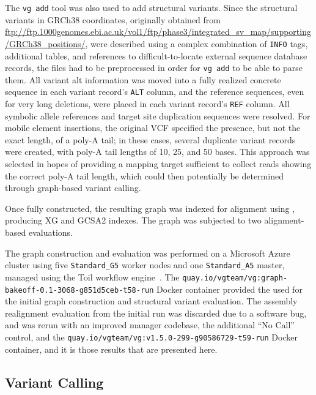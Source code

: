 The \texttt{vg add} tool was also used to add structural variants. Since the structural variants in GRCh38 coordinates, originally obtained from \url{ftp://ftp.1000genomes.ebi.ac.uk/vol1/ftp/phase3/integrated_sv_map/supporting/GRCh38_positions/}, were described using a complex combination of \texttt{INFO} tags, additional tables, and references to difficult-to-locate external sequence database records, the files had to be preprocessed in order for \texttt{vg add} to be able to parse them. All variant alt information was moved into a fully realized concrete sequence in each variant record's \texttt{ALT} column, and the reference sequences, even for very long deletions, were placed in each variant record's \texttt{REF} column. All symbolic allele references and target site duplication sequences were resolved. For mobile element insertions, the original VCF specified the presence, but not the exact length, of a poly-A tail; in these cases, several duplicate variant records were created, with poly-A tail lengths of 10, 25, and 50 bases. This approach was selected in hopes of providing a mapping target sufficient to collect reads showing the correct poly-A tail length, which could then potentially be determined through graph-based variant calling.

Once fully constructed, the resulting graph was indexed for alignment using \vg, producing XG and GCSA2 indexes. The graph was subjected to two alignment-based evaluations.

The graph construction and evaluation was performed on a Microsoft Azure cluster using five \texttt{Standard\_G5} worker nodes and one \texttt{Standard\_A5} master, managed using the Toil workflow engine~\cite{vivian2017toil}. The \texttt{quay.io/vgteam/vg:graph-bakeoff-0.1-3068-g851d5ceb-t58-run} Docker container provided the \vg used for the initial graph construction and structural variant evaluation. The assembly realignment evaluation from the initial run was discarded due to a software bug, and was rerun with an improved manager codebase, the additional ``No Call'' control, and the \texttt{quay.io/vgteam/vg:v1.5.0-299-g90586729-t59-run} Docker container, and it is those results that are presented here.

\subsection{Variant Calling}


